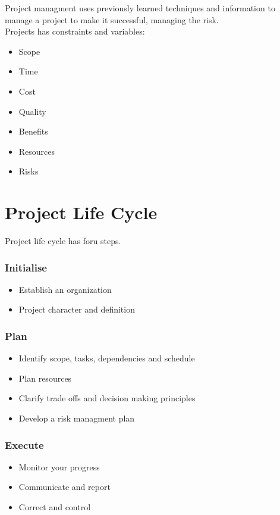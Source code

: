 \documentclass[11pt,a4paper,twocolumn]{book}
\begin{document}
Project managment uses previously learned techniques and information to manage a project to make it successful, managing the risk.\\

Projects has constraints and variables:

\begin{itemize}
\item Scope
\item Time
\item Cost
\item Quality
\item Benefits
\item Resources
\item Risks
\end{itemize}

\section{Project Life Cycle}

Project life cycle has foru steps.

\subsubsection{Initialise}
\begin{itemize}
\item Establish an organization
\item Project character and definition
\end{itemize}

\subsubsection{Plan}
\begin{itemize}
\item Identify scope, tasks, dependencies and schedule
\item Plan resources
\item Clarify trade offs and decision making principles
\item Develop a risk managment plan
\end{itemize}

\subsubsection{Execute}
\begin{itemize}
\item Monitor your progress
\item Communicate and report
\item Correct and control
\end{itemize}
\end{document}
